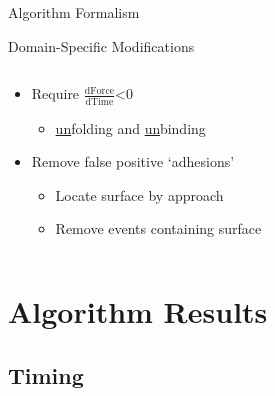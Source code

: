 \documentclass[usenames,dvipsnames]{beamer}
\begin{document}
\begin{frame}{Algorithm Formalism}
\end{frame}

\begin{frame}{Domain-Specific Modifications}

\begin{columns}[T]
\begin{column}{0.6\textwidth}

\begin{itemize}
  \item Require $\frac{\mathrm{dForce}}{\mathrm{dTime}}$<0
    \begin{itemize}
      \item \underline{un}folding and \underline{un}binding
    \end{itemize}
  \item Remove false positive `adhesions'
    \begin{itemize}
      \item Locate surface by approach 
      \item Remove events containing surface
    \end{itemize}
\end{itemize}
\end{column}

\begin{column}{0.4\textwidth}
\end{column}
\end{columns}

\end{frame}


\section{Algorithm Results}

\subsection{Timing}
\end{document}
